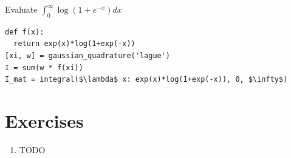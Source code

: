 \documentclass[book.tex]{subfiles}
\begin{document}
\begin{example}
Evaluate $ \int_{0}^{\infty}\log(1+e^{-x})dx$

\begin{lstlisting}
def f(x):
  return exp(x)*log(1+exp(-x))
[xi, w] = gaussian_quadrature('lague')
I = sum(w * f(xi))
I_mat = integral($\lambda$ x: exp(x)*log(1+exp(-x)), 0, $\infty$)
\end{lstlisting}
\section{Exercises}
\begin{enumerate}
    \item TODO
\end{enumerate}
\end{example}
\end{document}
